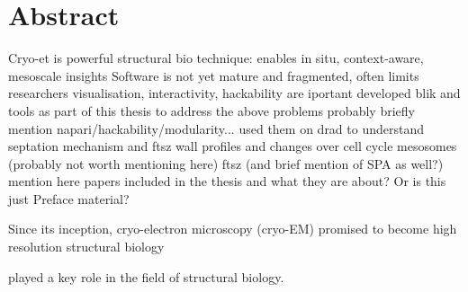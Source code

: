 \section*{Abstract}

\begin{outline}
\1 Cryo-et is powerful structural bio technique: enables in situ, context-aware, mesoscale insights
\1 Software is not yet mature and fragmented, often limits researchers
\1 visualisation, interactivity, hackability are iportant
\1 developed blik and tools as part of this thesis to address the above problems
    \2 probably briefly mention napari/hackability/modularity...
\1 used them on drad to understand septation mechanism and ftsz
    \2 wall profiles and changes over cell cycle
    \2 mesosomes (probably not worth mentioning here)
    \2 ftsz (and brief mention of SPA as well?)
\1 mention here papers included in the thesis and what they are about? Or is this just Preface material?
\end{outline}


Since its inception, cryo-electron microscopy (cryo-EM) promised to become high resolution structural biology

played a key role in the field of structural biology.

